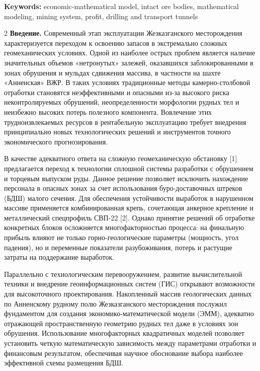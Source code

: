{\bfseries Keywords:} economic-mathematical model, intact ore bodies,
mathematical modeling, mining system, profit, drilling and transport
tunnels

\begin{multicols}{2}
{\bfseries Введение.} Современный этап эксплуатации Жезказганского
месторождения характеризуется переходом к освоению запасов в
экстремально сложных геомеханических условиях. Одной из наиболее острых
проблем является наличие значительных объемов «нетронутых» залежей,
оказавшихся заблокированными в зонах обрушения и мульдах сдвижения
массива, в частности на шахте «Анненская» ВЖР. В таких условиях
традиционные методы камерно-столбовой отработки становятся
неэффективными и опасными из-за высокого риска неконтролируемых
обрушений, неопределенности морфологии рудных тел и неизбежно высоких
потерь полезного компонента. Вовлечение этих трудноизвлекаемых ресурсов
в рентабельную эксплуатацию требует внедрения принципиально новых
технологических решений и инструментов точного экономического
прогнозирования.

В качестве адекватного ответа на сложную геомеханическую обстановку
{[}1{]} предлагается переход к технологии сплошной системы разработки с
обрушением и торцевым выпуском руды. Данное решение позволяет исключить
нахождение персонала в опасных зонах за счет использования
буро-доставочных штреков (БДШ) малого сечения. Для обеспечения
устойчивости выработок в нарушенном массиве применяется комбинированная
крепь, сочетающая анкерное крепление и металлический спецпрофиль СВП-22
{[}2{]}. Однако принятие решений об отработке конкретных блоков
осложняется многофакторностью процесса: на финальную прибыль влияют не
только горно-геологические параметры (мощность, угол падения), но и
переменные показатели разубоживания, потерь и растущие затраты на
поддержание выработок.

Параллельно с технологическим перевооружением, развитие вычислительной
техники и внедрение геоинформационных систем (ГИС) открывают возможности
для высокоточного проектирования. Накопленный массив геологических
данных по Анненскому рудному полю Жезказганского месторождения послужил
фундаментом для создания экономико-математической модели (ЭММ),
адекватно отражающей пространственную геометрию рудных тел даже в
условиях зон обрушения. Использование многофакторных квадратичных
моделей позволяет установить четкую математическую зависимость между
параметрами отработки и финансовым результатом, обеспечивая научное
обоснование выбора наиболее эффективной схемы размещения БДШ.


\end{multicols}
